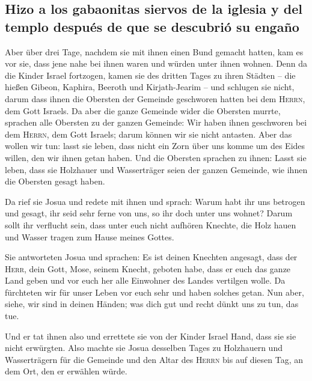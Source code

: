 \hypertarget{hizo-a-los-gabaonitas-siervos-de-la-iglesia-y-del-templo-despuuxe9s-de-que-se-descubriuxf3-su-engauxf1o}{%
\subsection{Hizo a los gabaonitas siervos de la iglesia y del templo
después de que se descubrió su
engaño}\label{hizo-a-los-gabaonitas-siervos-de-la-iglesia-y-del-templo-despuuxe9s-de-que-se-descubriuxf3-su-engauxf1o}}

 Aber über drei Tage, nachdem sie mit ihnen einen Bund
gemacht hatten, kam es vor sie, dass jene nahe bei ihnen waren und
würden unter ihnen wohnen.  Denn da die Kinder Israel
fortzogen, kamen sie des dritten Tages zu ihren Städten -- die hießen
Gibeon, Kaphira, Beeroth und Kirjath-Jearim --  und
schlugen sie nicht, darum dass ihnen die Obersten der Gemeinde
geschworen hatten bei dem \textsc{Herrn}, dem Gott Israels. Da aber die
ganze Gemeinde wider die Obersten murrte,  sprachen alle
Obersten zu der ganzen Gemeinde: Wir haben ihnen geschworen bei dem
\textsc{Herrn}, dem Gott Israels; darum können wir sie nicht antasten.
 Aber das wollen wir tun: lasst sie leben, dass nicht ein
Zorn über uns komme um des Eides willen, den wir ihnen getan haben.
 Und die Obersten sprachen zu ihnen: Lasst sie leben,
dass sie Holzhauer und Wasserträger seien der ganzen Gemeinde, wie ihnen
die Obersten gesagt haben.

 Da rief sie Josua und redete mit ihnen und sprach: Warum
habt ihr uns betrogen und gesagt, ihr seid sehr ferne von uns, so ihr
doch unter uns wohnet?  Darum sollt ihr verflucht sein,
dass unter euch nicht aufhören Knechte, die Holz hauen und Wasser tragen
zum Hause meines Gottes.

 Sie antworteten Josua und sprachen: Es ist deinen
Knechten angesagt, dass der \textsc{Herr}, dein Gott, Mose, seinem
Knecht, geboten habe, dass er euch das ganze Land geben und vor euch her
alle Einwohner des Landes vertilgen wolle. Da fürchteten wir für unser
Leben vor euch sehr und haben solches getan.  Nun aber,
siehe, wir sind in deinen Händen; was dich gut und recht dünkt uns zu
tun, das tue.

 Und er tat ihnen also und errettete sie von der Kinder
Israel Hand, dass sie sie nicht erwürgten.  Also machte
sie Josua desselben Tages zu Holzhauern und Wasserträgern für die
Gemeinde und den Altar des \textsc{Herrn} bis auf diesen Tag, an dem
Ort, den er erwählen würde.

